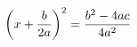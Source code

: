 \documentclass[preview]{standalone}
\begin{document}
\begin{align*}
\special{dvisvgm:raw <g id='unique000'>}\left(x + \frac{b}{2a}\right)^2 = \frac{b^2 - 4ac}{4a^2}\special{dvisvgm:raw </g>}
\end{align*}
\end{document}
